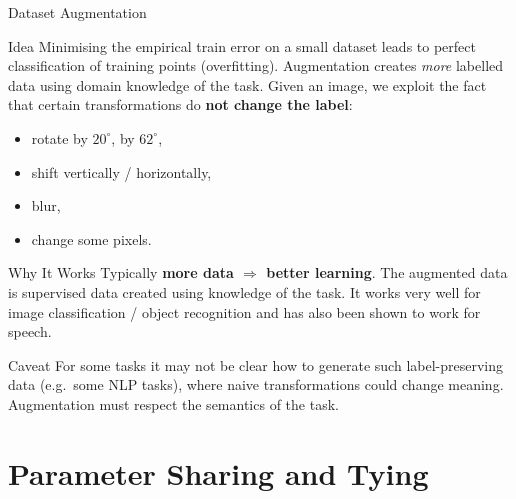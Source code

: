 \documentclass{beamer}
\begin{document}
\begin{frame}[shrink=10]{Dataset Augmentation}
  \begin{block}{Idea}
    Minimising the empirical train error on a small dataset leads to
    perfect classification of training points (overfitting). Augmentation
    creates \emph{more} labelled data using domain knowledge of the task.
    Given an image, we exploit the fact that certain transformations do
    \textbf{not change the label}:
    \begin{itemize}\setlength\itemsep{1pt}
      \item rotate by $20^{\circ}$, by $62^{\circ}$,
      \item shift vertically / horizontally,
      \item blur,
      \item change some pixels.
    \end{itemize}
  \end{block}

  \begin{block}{Why It Works}
    Typically \textbf{more data $\Rightarrow$ better learning}. The
    augmented data is supervised data created using knowledge of the task.
    It works very well for image classification / object recognition and
    has also been shown to work for speech.
  \end{block}

  \begin{exampleblock}{Caveat}
    For some tasks it may not be clear how to generate such label-preserving
    data (e.g.\ some NLP tasks), where naive transformations could change
    meaning. Augmentation must respect the semantics of the task.
  \end{exampleblock}
\end{frame}

\section{Parameter Sharing and Tying}
\end{document}
